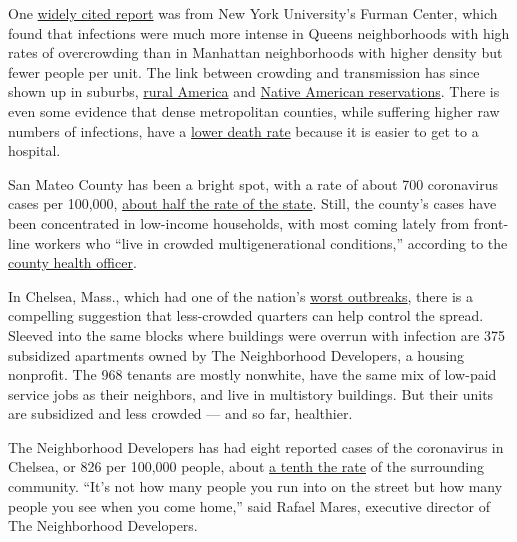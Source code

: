 One
\href{https://furmancenter.org/thestoop/entry/covid-19-cases-in-new-york-city-a-neighborhood-level-analysis}{widely
cited report} was from New York University's Furman Center, which found
that infections were much more intense in Queens neighborhoods with high
rates of overcrowding than in Manhattan neighborhoods with higher
density but fewer people per unit. The link between crowding and
transmission has since shown up in suburbs,
\href{https://www.wsj.com/articles/covid-19-households-spread-coronavirus-families-navajo-california-second-wave-11591553896}{rural
America} and
\href{https://www.azcentral.com/story/news/local/arizona-health/2020/05/12/close-knit-navajo-nation-communities-arizona-virus-takes-hold/3115961001/}{Native
American reservations}. There is even some evidence that dense
metropolitan counties, while suffering higher raw numbers of infections,
have a
\href{https://www.ncbi.nlm.nih.gov/pmc/articles/PMC7315990/}{lower death
rate} because it is easier to get to a hospital.

San Mateo County has been a bright spot, with a rate of about 700
coronavirus cases per 100,000,
\href{https://www.nytimes3xbfgragh.onion/interactive/2020/us/california-coronavirus-cases.html}{about
half the rate of the state}. Still, the county's cases have been
concentrated in low-income households, with most coming lately from
front-line workers who ``live in crowded multigenerational conditions,''
according to the
\href{https://www.smchealth.org/coronavirus-health-officer-updates}{county
health officer}.

In Chelsea, Mass., which had one of the nation's
\href{https://www.nytimes3xbfgragh.onion/2020/04/25/us/coronavirus-chelsea-massachusetts.html}{worst
outbreaks}, there is a compelling suggestion that less-crowded quarters
can help control the spread. Sleeved into the same blocks where
buildings were overrun with infection are 375 subsidized apartments
owned by The Neighborhood Developers, a housing nonprofit. The 968
tenants are mostly nonwhite, have the same mix of low-paid service jobs
as their neighbors, and live in multistory buildings. But their units
are subsidized and less crowded --- and so far, healthier.

The Neighborhood Developers has had eight reported cases of the
coronavirus in Chelsea, or 826 per 100,000 people, about
\href{https://www.mass.gov/doc/weekly-covid-19-public-health-report-july-22-2020/download}{a
tenth the rate} of the surrounding community. ``It's not how many people
you run into on the street but how many people you see when you come
home,'' said Rafael Mares, executive director of The Neighborhood
Developers.

